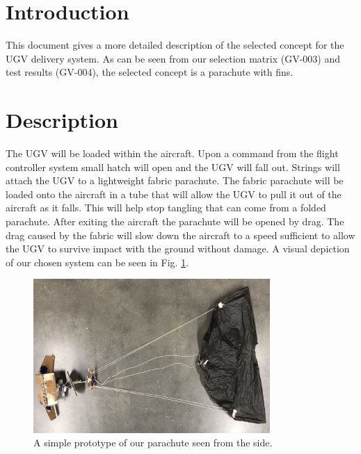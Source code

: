 \documentclass[]{auvsi_doc}
\begin{document}
\begin{AUVSITitlePage}
\begin{artifacttable}
\end{artifacttable}
\end{AUVSITitlePage}

\section{Introduction}
This document gives a more detailed description of the selected concept for the UGV delivery system. As can be seen from our selection matrix (GV-003) and test results (GV-004), the selected concept is a parachute with fins.

\section{Description}

The UGV will be loaded within the aircraft. Upon a command from the flight controller system small hatch will open and the UGV will fall out. Strings will attach the UGV to a lightweight fabric parachute. The fabric parachute will be loaded onto the aircraft in a tube that will allow the UGV to pull it out of the aircraft as it falls. This will help stop tangling that can come from a folded parachute. After exiting the aircraft the parachute will be opened by drag. The drag caused by the fabric will slow down the aircraft to a speed sufficient to allow the UGV to survive impact with the ground without damage. A visual depiction of our chosen system can be seen in Fig. \ref{fig:side}.

\begin{figure}[h]
\centering
\includegraphics[width=90mm]{./figs/Parachute_Side.jpg}
\caption{A simple prototype of our parachute seen from the side.}
\label{fig:side}
\end{figure}
\end{document}
